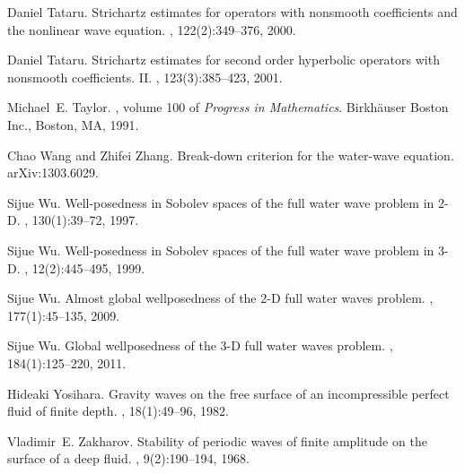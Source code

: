 \documentclass[11pt,english]{smfart}
\theoremstyle{plain}
\theoremstyle{definition}
\numberwithin{equation}{section}
\begin{document}
\begin{thebibliography}{10}
Daniel Tataru.
\newblock Strichartz estimates for operators with nonsmooth coefficients and
  the nonlinear wave equation.
, 122(2):349--376, 2000.

Daniel Tataru.
\newblock Strichartz estimates for second order hyperbolic operators with
  nonsmooth coefficients. {II}.
, 123(3):385--423, 2001.

Michael~E. Taylor.
, volume 100 of
  {\em Progress in Mathematics}.
\newblock Birkh\"auser Boston Inc., Boston, MA, 1991.

Chao Wang and Zhifei Zhang.
\newblock Break-down criterion for the water-wave equation.
\newblock  arXiv:1303.6029.

Sijue Wu.
\newblock Well-posedness in {S}obolev spaces of the full water wave problem in
  2-{D}.
, 130(1):39--72, 1997.

Sijue Wu.
\newblock Well-posedness in {S}obolev spaces of the full water wave problem in
  3-{D}.
, 12(2):445--495, 1999.

Sijue Wu.
\newblock Almost global wellposedness of the 2-{D} full water waves problem.
, 177(1):45--135, 2009.

Sijue Wu.
\newblock Global wellposedness of the 3-{D} full water waves problem.
, 184(1):125--220, 2011.

Hideaki Yosihara.
\newblock Gravity waves on the free surface of an incompressible perfect fluid
  of finite depth.
, 18(1):49--96, 1982.

Vladimir~E. Zakharov.
\newblock Stability of periodic waves of finite amplitude on the surface of a
  deep fluid.
,
  9(2):190--194, 1968.

\end{thebibliography}
 
\end{document}
